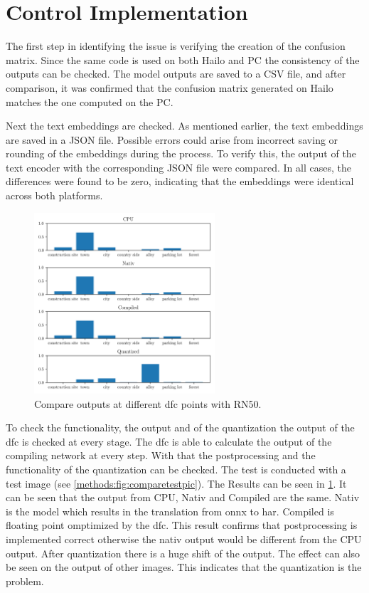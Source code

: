 \section{Control Implementation
    \label{scetion:methods:contimp}}

The first step in identifying the issue is verifying the creation of the confusion matrix.
Since the same code is used on both Hailo and PC the consistency of the outputs can be checked.
The model outputs are saved to a CSV file, and after comparison, it was confirmed that the confusion matrix generated on Hailo matches the one computed on the PC.

Next the text embeddings are checked.
As mentioned earlier, the text embeddings are saved in a JSON file.
Possible errors could arise from incorrect saving or rounding of the embeddings during the process.
To verify this, the output of the text encoder with the corresponding JSON file were compared.
In all cases, the differences were found to be zero, indicating that the embeddings were identical across both platforms.

\begin{figure}[h]
    \centering
    \includegraphics[width=0.6\textwidth]{Images/Implementation/compareProbs_RN50.png}
    \caption{Compare outputs at different \acrshort{dfc} points with RN50.}
    \label{methods:fig:comparern50}
\end{figure}

To check the functionality, the output and of the quantization the output of the \acrshort{dfc} is checked at every stage.
The \acrshort{dfc} is able to calculate the output of the compiling network at every step.
With that the postprocessing and the functionality of the quantization can be checked.
The test is conducted with a test image (see \cref{methods:fig:comparetestpic}).
The Results can be seen in \cref{methods:fig:comparern50}.
It can be seen that the output from CPU, Nativ and Compiled are the same.
Nativ is the model which results in the translation from onnx to \acrshort{har}.
Compiled is floating point omptimized by the \acrshort{dfc}.
This result confirms that postprocessing is implemented correct otherwise the nativ output would be different from the CPU output.
After quantization there is a huge shift of the output.
The effect can also be seen on the output of other images.
This indicates that the quantization is the problem.

